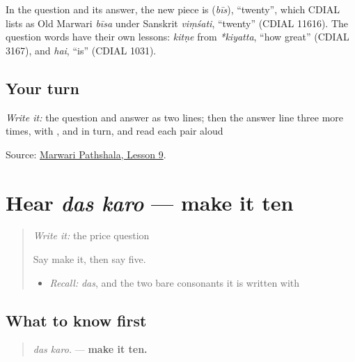 \begin{cousinweb}
In the question and its answer, the new piece is \textbf{} (\emph{bīs}), \textquotedblleft{}twenty\textquotedblright{}, which CDIAL lists as Old Marwari \emph{bīsa} under Sanskrit \emph{viṃśati}, \textquotedblleft{}twenty\textquotedblright{} (CDIAL 11616). The question words have their own lessons: \emph{kitṇe} from \emph{*kiyatta}, \textquotedblleft{}how great\textquotedblright{} (CDIAL 3167), and \emph{hai}, \textquotedblleft{}is\textquotedblright{} (CDIAL 1031).
\end{cousinweb}

\subsection*{Your turn}
\emph{Write it:} the question and answer as two lines; then the answer line three more times, with \textbf{}, \textbf{} and \textbf{} in turn, and read each pair aloud

\begin{tcolorbox}[breakable,colback=teal!4,colframe=teal!35!black,title={Before you move on}]
Source: \href{https://www.marwaripathshala.com/marwari-lesson-9-english}{Marwari Pathshala, Lesson 9}.
\end{tcolorbox}
\section[das karo.]{Hear \emph{das karo} — make it ten}

\label{lesson:MW-C34-hear-counter-offer}



\begin{quote}
\emph{Write it:} the price question

Say make it, then say five.

\begin{itemize}
\raggedright
  \item \emph{Recall:} \emph{das}, and the two bare consonants it is written with
\end{itemize}
\end{quote}

\subsection*{What to know first}
\begin{quote}
\emph{das karo.} — \textbf{make it ten.}
\end{quote}

